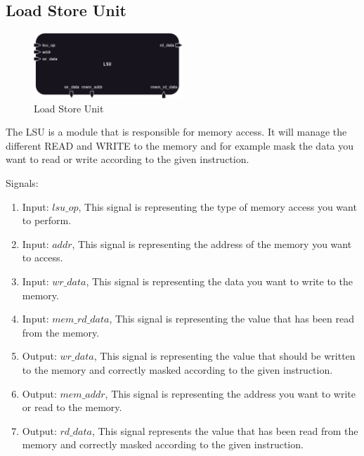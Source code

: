 \subsection{Load Store Unit}

\begin{figure}[H]
    \centering
    \includegraphics[width=0.5\textwidth]{../diagrams/memory/lsu.png}
    \caption{Load Store Unit}
    \label{fig:lsu}
\end{figure}

The LSU is a module that is responsible for memory access. It will manage the different READ and WRITE to the memory and for example
mask the data you want to read or write according to the given instruction.

Signals:
\begin{enumerate}[label={\textbullet}]
    \item Input: $lsu\_op$, This signal is representing the type of memory access you want to perform.
    \item Input: $addr$, This signal is representing the address of the memory you want to access.
    \item Input: $wr\_data$, This signal is representing the data you want to write to the memory.
    \item Input: $mem\_rd\_data$, This signal is representing the value that has been read from the memory.
    \item Output: $wr\_data$, This signal is representing the value that should be written to the memory and correctly
    masked according to the given instruction.
    \item Output: $mem\_addr$, This signal is representing the address you want to write or read to the memory.
    \item Output: $rd\_data$, This signal represents the value that has been read from the memory and correctly 
    masked according to the given instruction.
\end{enumerate}